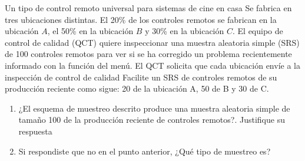 \item Un tipo de control remoto universal para sistemas de cine en casa Se fabrica en tres ubicaciones distintas. El 20\% de los controles remotos se fabrican en la ubicación $A$, el 50\% en la ubicación $B$ y 30\% en la ubicación $C$. El equipo de control de calidad (QCT) quiere inspeccionar una muestra aleatoria simple (SRS) de 100 controles remotos para ver si se ha corregido un problema recientemente informado con la función del menú. El QCT solicita que cada ubicación envíe a la inspección de control de calidad Facilite un SRS de controles remotos de su producción reciente como sigue: 20 de la ubicación A, 50 de B y 30 de C.
\begin{enumerate}
  \item ¿El esquema de muestreo descrito produce una muestra aleatoria simple de       tamaño 100 de la producción reciente de controles remotos?. Justifique su           respuesta
  \item Si respondiste que no en el punto anterior, ¿Qué tipo de muestreo es?
\end{enumerate}